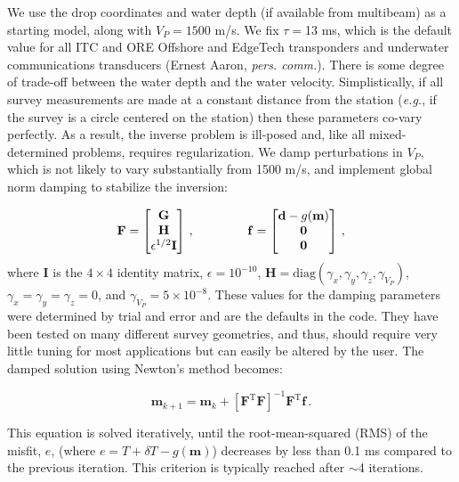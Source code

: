 \documentclass[10pt,titlepage]{article}
\begin{document}
We use the drop coordinates and water depth (if available from multibeam) as a starting model, along with $V_P = 1500$ m/s. We fix $\tau =$13 ms, which is the default value for all ITC and ORE Offshore and EdgeTech transponders and underwater communications transducers (Ernest Aaron, \textit{pers. comm.}). There is some degree of trade-off between the water depth and the water velocity. Simplistically, if all survey measurements are made at a constant distance from the station (\textit{e.g.}, if the survey is a circle centered on the station) then these parameters co-vary perfectly. As a result, the inverse problem is ill-posed and, like all mixed-determined problems, requires regularization. We damp perturbations in $V_P$, which is not likely to vary substantially from 1500 m/s, and implement global norm damping to stabilize the inversion:

\begin{equation}
	\mathbf{F} = 
	\left[\begin{matrix}
	\mathbf{G}\\\mathbf{H}\\\epsilon^{1/2}\mathbf{I}
	\end{matrix}\right] \,,
	\hspace{15mm}
	\mathbf{f} = 
	\left[\begin{matrix}
	\mathbf{d} - g(\mathbf{m})\\\mathbf{0}\\\mathbf{0}
	\end{matrix}\right] \,,
\end{equation}
where $\mathbf{I}$ is the $4\times 4$ identity matrix, $\epsilon = 10^{-10}$, $\mathbf{H}=\text{diag}\left( \gamma_{x}, \gamma_{y}, \gamma_{z}, \gamma_{V_P} \right)$, $\gamma_{x}=\gamma_{y}=\gamma_{z}=0$, and $\gamma_{V_P} = 5\times10^{-8}$. These values for the damping parameters were determined by trial and error and are the defaults in the code. They have been tested on many different survey geometries, and thus, should require very little tuning for most applications but can easily be altered by the user. The damped solution using Newton's method becomes:

\begin{equation}
	\mathbf{m}_{k+1} = \mathbf{m}_k + \left[ \mathbf{F}^{\text{T}} \mathbf{F} \right]^{-1} \mathbf{F}^{\text{T}} \mathbf{f} \,. \label{eq:inverse}
\end{equation}

This equation is solved iteratively, until the root-mean-squared (RMS) of the misfit, $e$, (where $e = T+\delta T-g(\mathbf{m})$) decreases by less than 0.1 ms compared to the previous iteration. This criterion is typically reached after $\sim$4 iterations. 
\end{document}
